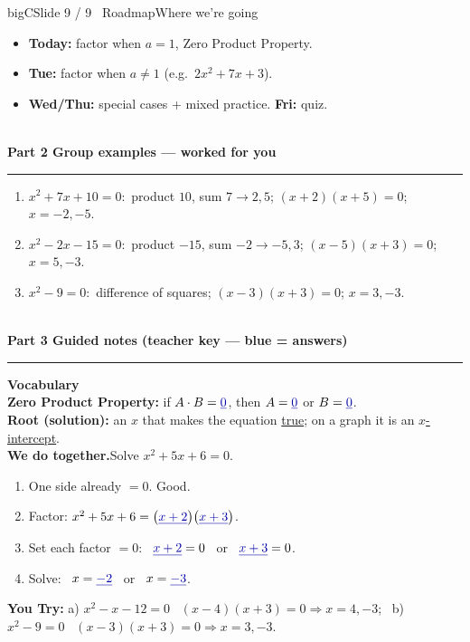 \documentclass[11pt]{article}
\newcommand{\parthead}[1]{\vspace{6pt}{\color{bigC}\rule{\linewidth}{2pt}}\\[3pt]{\LARGE\bfseries\color{bigC!80!black} #1}\\[2pt]{\color{bigC}\rule{\linewidth}{2pt}}\vspace{6pt}}
\begin{document}
\begin{slide}{bigC}{Slide 9 / 9 \textbullet\ Roadmap}{Where we're going}
\begin{itemize}[leftmargin=1.3em,itemsep=1pt]
\item \textbf{Today:} factor when $a=1$, Zero Product Property.
\item \textbf{Tue:} factor when $a\ne 1$ (e.g.\ $2x^{2}+7x+3$).
\item \textbf{Wed/Thu:} special cases + mixed practice. \quad \textbf{Fri:} quiz.
\end{itemize}
\end{slide}

\parthead{Part 2 \; Group examples --- worked for you}
\begin{enumerate}[leftmargin=1.6em,itemsep=4pt]
\item $x^{2}+7x+10=0$:\ product $10$, sum $7\to 2,5$; $(x+2)(x+5)=0$; $x=-2,-5$.
\item $x^{2}-2x-15=0$:\ product $-15$, sum $-2\to -5,3$; $(x-5)(x+3)=0$; $x=5,-3$.
\item $x^{2}-9=0$:\ difference of squares; $(x-3)(x+3)=0$; $x=3,-3$.
\end{enumerate}

\parthead{Part 3 \; Guided notes (teacher key --- blue = answers)}
\textbf{Vocabulary}\\[3pt]
\textbf{Zero Product Property:} if $A\cdot B=\textcolor{blue!65!black}{\underline{0}}$, then $A=\textcolor{blue!65!black}{\underline{0}}$ or $B=\textcolor{blue!65!black}{\underline{0}}$.\\[6pt]
\textbf{Root (solution):} an $x$ that makes the equation \textcolor{blue!65!black}{\underline{true}}; on a graph it is an \textcolor{blue!65!black}{\underline{$x$-intercept}}.\\[8pt]
\textbf{We do together.}\quad Solve $x^{2}+5x+6=0$.
\begin{enumerate}[label=\textbf{Step \arabic*.},leftmargin=3em,itemsep=3pt]
\item One side already $=0$. Good.
\item Factor: $x^{2}+5x+6=\big(\textcolor{blue!65!black}{\underline{x+2}}\big)\big(\textcolor{blue!65!black}{\underline{x+3}}\big)$.
\item Set each factor $=0$: \ $\textcolor{blue!65!black}{\underline{x+2}}=0$ \ or \ $\textcolor{blue!65!black}{\underline{x+3}}=0$.
\item Solve: \ $x=\textcolor{blue!65!black}{\underline{-2}}$ \ or \ $x=\textcolor{blue!65!black}{\underline{-3}}$.
\end{enumerate}
\vspace{2pt}\textbf{You Try:} a) $x^{2}-x-12=0$ \ \textcolor{blue!65!black}{$(x-4)(x+3)=0\Rightarrow x=4,-3$}; \ b) $x^{2}-9=0$ \ \textcolor{blue!65!black}{$(x-3)(x+3)=0\Rightarrow x=3,-3$}.
\end{document}
